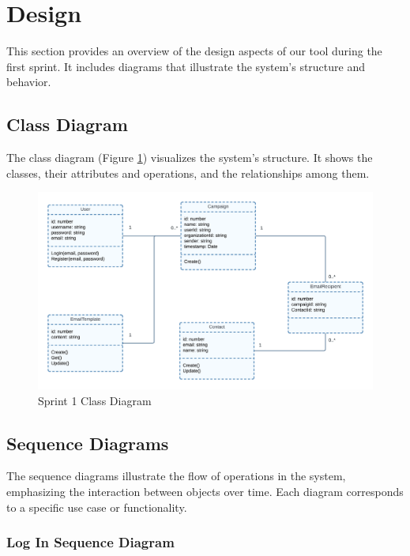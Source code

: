 \section{Design}

This section provides an overview of the design aspects of our tool during the first sprint. It includes diagrams that illustrate the system's structure and behavior.

\subsection{Class Diagram}

The class diagram (Figure \ref{fig:Sprint 1 Class Diagram}) visualizes the system's structure. It shows the classes, their attributes and operations, and the relationships among them.

\begin{figure}[ht]
	\centering
	\includegraphics[width=\linewidth]{Images/Sprint1/class_diag_sprint_1.png}
	\caption{Sprint 1 Class Diagram}
	\label{fig:Sprint 1 Class Diagram}
\end{figure}


\clearpage

\subsection{Sequence Diagrams}

The sequence diagrams illustrate the flow of operations in the system, emphasizing the interaction between objects over time. Each diagram corresponds to a specific use case or functionality.

\subsubsection{Log In Sequence Diagram}

